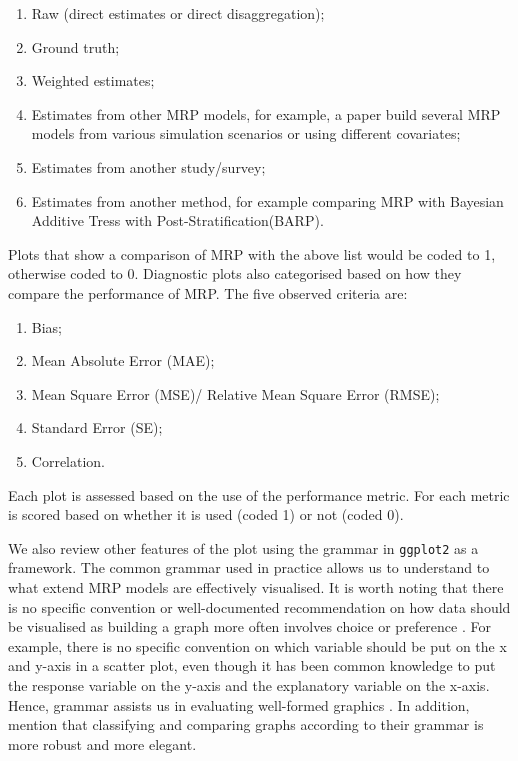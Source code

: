 \documentclass{monashthesis}
\begin{document}
\begin{enumerate}
\def\labelenumi{\arabic{enumi}.}
\tightlist
\item
  Raw (direct estimates or direct disaggregation);
\item
  Ground truth;
\item
  Weighted estimates;
\item
  Estimates from other MRP models, for example, a paper build several MRP models from various simulation scenarios or using different covariates;
\item
  Estimates from another study/survey;
\item
  Estimates from another method, for example comparing MRP with Bayesian Additive Tress with Post-Stratification(BARP).
\end{enumerate}

Plots that show a comparison of MRP with the above list would be coded to 1, otherwise coded to 0.
Diagnostic plots also categorised based on how they compare the performance of MRP. The five observed criteria are:

\begin{enumerate}
\def\labelenumi{\arabic{enumi}.}
\tightlist
\item
  Bias;
\item
  Mean Absolute Error (MAE);
\item
  Mean Square Error (MSE)/ Relative Mean Square Error (RMSE);
\item
  Standard Error (SE);
\item
  Correlation.
\end{enumerate}

Each plot is assessed based on the use of the performance metric. For each metric is scored based on whether it is used (coded 1) or not (coded 0).

We also review other features of the plot using the grammar in \texttt{ggplot2} \autocite{ggplot2} as a framework. The common grammar used in practice allows us to understand to what extend MRP models are effectively visualised. It is worth noting that there is no specific convention or well-documented recommendation on how data should be visualised as building a graph more often involves choice or preference \autocite{MIDWAY2020100141}. For example, there is no specific convention on which variable should be put on the x and y-axis in a scatter plot, even though it has been common knowledge to put the response variable on the y-axis and the explanatory variable on the x-axis. Hence, grammar assists us in evaluating well-formed graphics \autocite{layered-grammar}. In addition, \textcite{vanderplas} mention that classifying and comparing graphs according to their grammar is more robust and more elegant.
\end{document}
